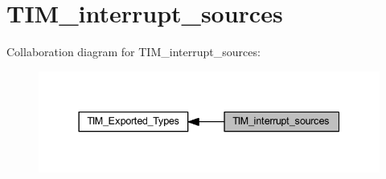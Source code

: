 \hypertarget{group___t_i_m__interrupt__sources}{}\section{T\+I\+M\+\_\+interrupt\+\_\+sources}
\label{group___t_i_m__interrupt__sources}
Collaboration diagram for T\+I\+M\+\_\+interrupt\+\_\+sources\+:
\nopagebreak
\begin{figure}[H]
\begin{center}
\leavevmode
\includegraphics[width=337pt]{group___t_i_m__interrupt__sources}
\end{center}
\end{figure}

